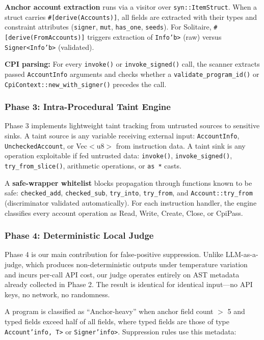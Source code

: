 \documentclass[conference]{IEEEtran}
\begin{document}
{\bf Anchor account extraction} runs via a visitor over \texttt{syn::ItemStruct}. When a struct carries \texttt{\#[derive(Accounts)]}, all fields are extracted with their types and constraint attributes (\texttt{signer}, \texttt{mut}, \texttt{has\_one}, \texttt{seeds}). For Solitaire, \texttt{\#[derive(FromAccounts)]} triggers extraction of \texttt{Info'{}b>} (raw) versus \texttt{Signer<Info'{}b>} (validated).

{\bf CPI parsing:} For every \texttt{invoke()} or \texttt{invoke\_signed()} call, the scanner extracts passed \texttt{AccountInfo} arguments and checks whether a \texttt{validate\_program\_id()} or \texttt{CpiContext::new\_with\_signer()} precedes the call.

\subsubsection{Phase 3: Intra-Procedural Taint Engine}

Phase 3 implements lightweight taint tracking from untrusted sources to sensitive sinks. A taint source is any variable receiving external input: \texttt{AccountInfo}, \texttt{UncheckedAccount}, or Vec$<$u8$>$ from instruction data. A taint sink is any operation exploitable if fed untrusted data: \texttt{invoke()}, \texttt{invoke\_signed()}, \texttt{try\_from\_slice()}, arithmetic operations, or \texttt{as *} casts.

A {\bf safe-wrapper whitelist} blocks propagation through functions known to be safe: \texttt{checked\_add}, \texttt{checked\_sub}, \texttt{try\_into}, \texttt{try\_from}, and \texttt{Account::try\_from} (discriminator validated automatically). For each instruction handler, the engine classifies every account operation as Read, Write, Create, Close, or CpiPass.

\subsubsection{Phase 4: Deterministic Local Judge}

Phase 4 is our main contribution for false-positive suppression. Unlike LLM-as-a-judge, which produces non-deterministic outputs under temperature variation and incurs per-call API cost, our judge operates entirely on AST metadata already collected in Phase 2. The result is identical for identical input---no API keys, no network, no randomness.

A program is classified as ``Anchor-heavy'' when anchor field count $>$ 5 and typed fields exceed half of all fields, where typed fields are those of type \texttt{Account'{}info, T>} or \texttt{Signer'{}info>}. Suppression rules use this metadata:
\end{document}
